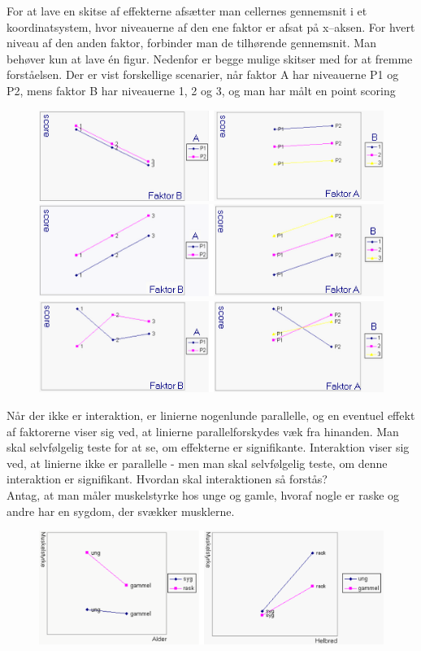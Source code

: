 \documentclass[11pt]{article}
\begin{document}
For at lave en skitse af effekterne afsætter man cellernes gennemsnit i et koordinatsystem, hvor niveauerne af den ene faktor er afsat på x--aksen. For hvert niveau af den anden faktor, forbinder man de tilhørende gennemsnit. Man behøver kun at lave én figur. Nedenfor er begge mulige skitser med for at fremme forståelsen. Der er vist forskellige scenarier, når faktor A har niveauerne P1 og P2, mens faktor B har niveauerne 1, 2 og 3, og man har målt en point scoring
\begin{figure}[H]
\centering
\includegraphics[scale=0.5]{img/Selection_023}
\includegraphics[scale=0.5]{img/Selection_024}
\includegraphics[scale=0.5]{img/Selection_025}
\end{figure}
Når der ikke er interaktion, er linierne nogenlunde parallelle, og en eventuel effekt af faktorerne viser sig ved, at linierne parallelforskydes væk fra hinanden. Man skal selvfølgelig teste for at se, om effekterne er signifikante. Interaktion viser sig ved, at linierne ikke er parallelle - men man skal selvfølgelig teste, om denne interaktion er signifikant. Hvordan skal interaktionen så forstås?\\[0.2cm]
Antag, at man måler muskelstyrke hos unge og gamle, hvoraf nogle er raske og andre har en sygdom, der svækker musklerne.
\begin{figure}[H]
\centering
\includegraphics[scale=0.5]{img/Selection_026}
\end{figure}
\end{document}

